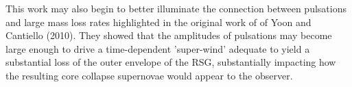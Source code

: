  This work may also begin to better illuminate the connection between
 pulsations and large mass loss rates highlighted in the original work of \citet{Yoon_2010}
 of Yoon and Cantiello (2010). They showed that the amplitudes of
 pulsations may become large enough to drive a time-dependent
 'super-wind' adequate to yield a substantial loss of the outer
 envelope of the RSG, substantially impacting how the resulting core
 collapse supernovae would appear to the observer. 